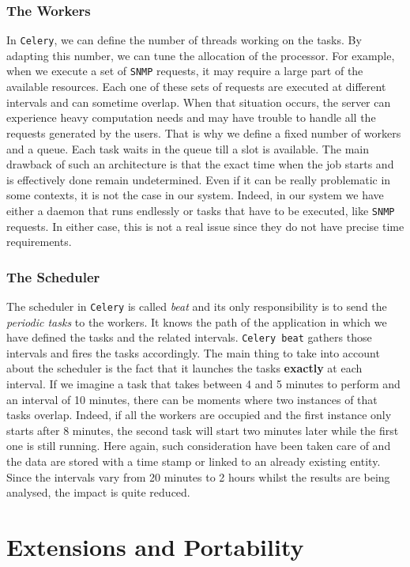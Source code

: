 \subsubsection*{The Workers}
In \texttt{Celery}, we can define the number of threads working on the tasks. By adapting this number, we can tune the allocation of the processor. For example, when we execute a set of \texttt{SNMP} requests, it may require a large part of the available resources. Each one of these sets of requests are executed at different intervals and can sometime overlap. When that situation occurs, the server can experience heavy computation needs and may have trouble to handle all the requests generated by the users. That is why we define a fixed number of workers and a queue. Each task waits in the queue till a slot is available. The main drawback of such an architecture is that the exact time when the job starts and is effectively done remain undetermined. Even if it can be really problematic in some contexts, it is not the case in our system. Indeed, in our system we have either a daemon that runs endlessly or tasks that have to be executed, like \texttt{SNMP} requests. In either case, this is not a real issue since they do not have precise time requirements. 


\subsubsection*{The Scheduler}
The scheduler in \texttt{Celery} is called \emph{beat} and its only responsibility is to send the \emph{periodic tasks} to the workers. It knows the path of the application in which we have defined the tasks and the related intervals. \texttt{Celery beat} gathers those intervals and fires the tasks accordingly. The main thing to take into account about the scheduler is the fact that it launches the tasks \textbf{exactly} at each interval. If we imagine a task that takes between 4 and 5 minutes to perform and an interval of 10 minutes, there can be moments where two instances of that tasks overlap. Indeed, if all the workers are occupied and the first instance only starts after 8 minutes, the second task will start two minutes later while the first one is still running. Here again, such consideration have been taken care of and the data are stored with a time stamp or linked to an already existing entity. Since the intervals vary from 20 minutes to 2 hours whilst the results are being analysed, the impact is quite reduced. 

\section{Extensions and Portability}

